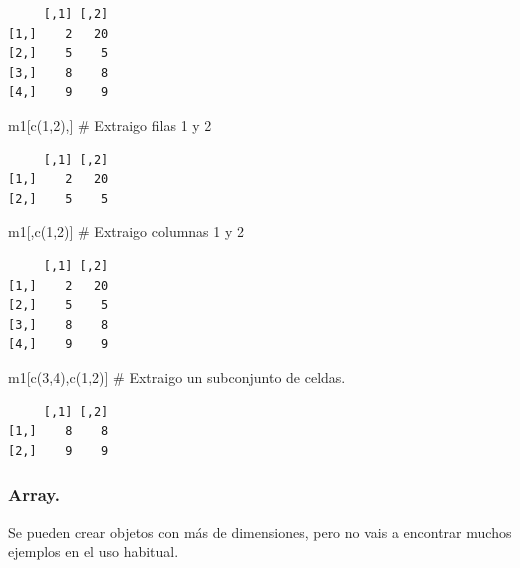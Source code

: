 \documentclass[
  letterpaper,
  DIV=11,
  numbers=noendperiod]{scrreprt}
\newenvironment{Shaded}{\begin{snugshade}}{\end{snugshade}}
\newcommand{\CommentTok}[1]{\textcolor[rgb]{0.37,0.37,0.37}{#1}}
\newcommand{\DecValTok}[1]{\textcolor[rgb]{0.68,0.00,0.00}{#1}}
\newcommand{\FunctionTok}[1]{\textcolor[rgb]{0.28,0.35,0.67}{#1}}
\newcommand{\NormalTok}[1]{\textcolor[rgb]{0.00,0.23,0.31}{#1}}
\begin{document}
\begin{verbatim}
     [,1] [,2]
[1,]    2   20
[2,]    5    5
[3,]    8    8
[4,]    9    9
\end{verbatim}

\begin{Shaded}
\begin{Highlighting}[]
\NormalTok{m1[}\FunctionTok{c}\NormalTok{(}\DecValTok{1}\NormalTok{,}\DecValTok{2}\NormalTok{),] }\CommentTok{\# Extraigo filas 1 y 2}
\end{Highlighting}
\end{Shaded}

\begin{verbatim}
     [,1] [,2]
[1,]    2   20
[2,]    5    5
\end{verbatim}

\begin{Shaded}
\begin{Highlighting}[]
\NormalTok{m1[,}\FunctionTok{c}\NormalTok{(}\DecValTok{1}\NormalTok{,}\DecValTok{2}\NormalTok{)] }\CommentTok{\# Extraigo columnas 1 y 2}
\end{Highlighting}
\end{Shaded}

\begin{verbatim}
     [,1] [,2]
[1,]    2   20
[2,]    5    5
[3,]    8    8
[4,]    9    9
\end{verbatim}

\begin{Shaded}
\begin{Highlighting}[]
\NormalTok{m1[}\FunctionTok{c}\NormalTok{(}\DecValTok{3}\NormalTok{,}\DecValTok{4}\NormalTok{),}\FunctionTok{c}\NormalTok{(}\DecValTok{1}\NormalTok{,}\DecValTok{2}\NormalTok{)] }\CommentTok{\# Extraigo un subconjunto de celdas.}
\end{Highlighting}
\end{Shaded}

\begin{verbatim}
     [,1] [,2]
[1,]    8    8
[2,]    9    9
\end{verbatim}

\hypertarget{array.}{%
\subsubsection{Array.}\label{array.}}

Se pueden crear objetos con más de dimensiones, pero no vais a encontrar
muchos ejemplos en el uso habitual.
\end{document}
